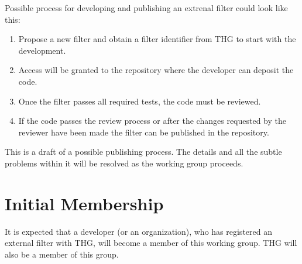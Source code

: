 \documentclass{scrartcl}
\begin{document}
Possible process for developing and publishing an extrenal filter could look like this:
\begin{enumerate}
    \item Propose a new filter and obtain a filter identifier from THG to
        start with the development.
    \item Access will be granted to the repository where the developer can deposit the
        code.
    \item Once the filter passes all required tests, the code must be reviewed.
    \item If the code passes the review process or after the changes requested
        by the reviewer have been made the filter can be published in the repository.
\end{enumerate}
This is a draft of a possible publishing process. The details
and all the subtle problems within it will be resolved as the working group
proceeds. 

\section{Initial Membership}
It is expected that a developer (or an organization), who has registered an external filter
with THG, will become a member of this working group. THG will also be a member of this group.
\end{document}
